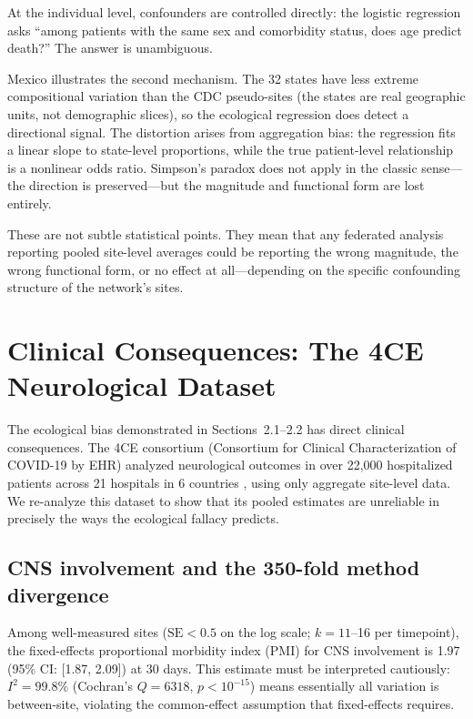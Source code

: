 \documentclass{article}
\begin{document}
At the individual level, confounders are controlled directly: the logistic
regression asks ``among patients with the same sex and comorbidity status,
does age predict death?''  The answer is unambiguous.

Mexico illustrates the second mechanism.  The 32 states have less extreme
compositional variation than the CDC pseudo-sites (the states are real
geographic units, not demographic slices), so the ecological regression does
detect a directional signal.  The distortion arises from aggregation bias:
the regression fits a linear slope to state-level proportions, while the
true patient-level relationship is a nonlinear odds ratio.  Simpson's
paradox does not apply in the classic sense---the direction is preserved---but
the magnitude and functional form are lost entirely.

These are not subtle statistical points.  They mean that any federated
analysis reporting pooled site-level averages could be reporting the wrong
magnitude, the wrong functional form, or no effect at all---depending on
the specific confounding structure of the network's sites.


\section{Clinical Consequences: The 4CE Neurological Dataset}

The ecological bias demonstrated in Sections~2.1--2.2 has direct clinical
consequences.  The 4CE consortium (Consortium for Clinical Characterization
of COVID-19 by EHR) analyzed neurological outcomes in over 22,000
hospitalized patients across 21 hospitals in 6 countries
\cite{four_ce_neuro2021}, using only aggregate site-level data.  We
re-analyze this dataset to show that its pooled estimates are unreliable in
precisely the ways the ecological fallacy predicts.


\subsection{CNS involvement and the 350-fold method divergence}

Among well-measured sites ($\text{SE} < 0.5$ on the log scale; $k = 11$--16
per timepoint), the fixed-effects proportional morbidity index (PMI) for CNS
involvement is 1.97 (95\% CI: [1.87, 2.09]) at 30 days.  This estimate must
be interpreted cautiously: $I^2 = 99.8\%$ (Cochran's $Q = 6318$, $p <
10^{-15}$) means essentially all variation is between-site, violating the
common-effect assumption that fixed-effects requires.
\end{document}
